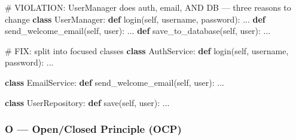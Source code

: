 \documentclass[11pt]{article}
\newenvironment{Shaded}{\begin{snugshade}}{\end{snugshade}}
\newcommand{\CommentTok}[1]{\textcolor[rgb]{0.48,0.49,0.49}{#1}}
\newcommand{\KeywordTok}[1]{\textcolor[rgb]{0.81,0.81,0.76}{\textbf{#1}}}
\newcommand{\NormalTok}[1]{\textcolor[rgb]{0.81,0.81,0.76}{#1}}
\newcommand{\VariableTok}[1]{\textcolor[rgb]{0.15,0.68,0.68}{#1}}
\begin{document}
\begin{Shaded}
\begin{Highlighting}[]
\CommentTok{\# VIOLATION: UserManager does auth, email, AND DB — three reasons to change}
\KeywordTok{class}\NormalTok{ UserManager:}
    \KeywordTok{def}\NormalTok{ login(}\VariableTok{self}\NormalTok{, username, password): ...}
    \KeywordTok{def}\NormalTok{ send\_welcome\_email(}\VariableTok{self}\NormalTok{, user): ...}
    \KeywordTok{def}\NormalTok{ save\_to\_database(}\VariableTok{self}\NormalTok{, user): ...}

\CommentTok{\# FIX: split into focused classes}
\KeywordTok{class}\NormalTok{ AuthService:}
    \KeywordTok{def}\NormalTok{ login(}\VariableTok{self}\NormalTok{, username, password): ...}

\KeywordTok{class}\NormalTok{ EmailService:}
    \KeywordTok{def}\NormalTok{ send\_welcome\_email(}\VariableTok{self}\NormalTok{, user): ...}

\KeywordTok{class}\NormalTok{ UserRepository:}
    \KeywordTok{def}\NormalTok{ save(}\VariableTok{self}\NormalTok{, user): ...}
\end{Highlighting}
\end{Shaded}

\subsubsection{O --- Open/Closed Principle (OCP)}\label{o--openclosed-principle-ocp}

\end{document}
